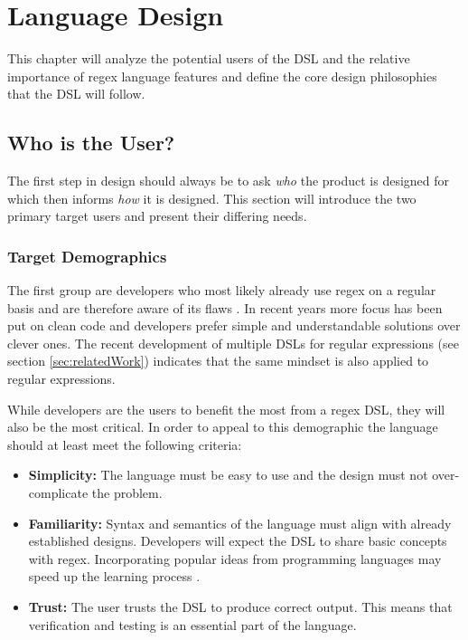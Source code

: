 
\chapter{Language Design}

This chapter will analyze the potential users of the DSL and the relative importance of regex language features and define the core design philosophies that the DSL will follow.

\section{Who is the User?}

The first step in design should always be to ask \emph{who} the product is designed for which then informs \emph{how} it is designed. This section will introduce the two primary target users and present their differing needs.

\subsection{Target Demographics}

The first group are developers who most likely already use regex on a regular basis and are therefore aware of its flaws \cite{RegexNotLinguaFranca}\cite{RegexesAreHard}. In recent years more focus has been put on clean code and developers prefer simple and understandable solutions over clever ones. The recent development of multiple DSLs for regular expressions (see section \ref{sec:relatedWork}) indicates that the same mindset is also applied to regular expressions.

While developers are the users to benefit the most from a regex DSL, they will also be the most critical. In order to appeal to this demographic the language should at least meet the following criteria:

\begin{itemize}
    \item \textbf{Simplicity:} 
        The language must be easy to use and the design must not over-complicate the problem. 
    \item \textbf{Familiarity:}
        Syntax and semantics of the language must align with already established designs. Developers will expect the DSL to share basic concepts with regex. Incorporating popular ideas from programming languages may speed up the learning process \cite{OnSuccessfulLanuageDesignKernighan}. 
    \item \textbf{Trust:}
        The user trusts the DSL to produce correct output. This means that verification and testing is an essential part of the language.
\end{itemize}

